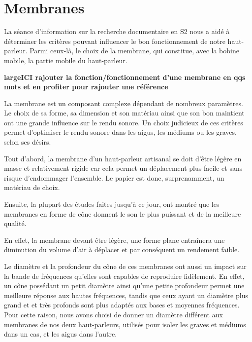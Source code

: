 \section{Membranes}

La séance d’information sur la recherche documentaire en S2
nous a aidé à déterminer les critères pouvant influencer
le bon fonctionnement de notre haut-parleur.
Parmi ceux-là, le choix de la membrane, qui constitue, avec la bobine mobile, la partie mobile
du haut-parleur.


\textbf{large{ICI rajouter la fonction/fonctionnement d'une membrane en qqs mots} et en profiter pour rajouter une référence}


La membrane est un composant complexe dépendant de nombreux paramètres. Le choix de sa forme, sa dimension et son matériau ainsi que son bon maintient ont une grande influence sur le rendu sonore. Un choix judicieux de ces critères permet d'optimiser le rendu sonore dans les aigus, les médiums ou les graves, selon ses désirs.

Tout d’abord, la membrane d’un haut-parleur artisanal
se doit d’être légère en masse et relativement rigide
car cela permet un déplacement plus facile et
sans risque d’endommager l’ensemble.
Le papier est donc, surprenamment, un matériau de choix.

Ensuite, la plupart des études faites jusqu’à ce jour,
ont montré que les membranes en forme de cône
donnent le son le plus puissant et de la meilleure qualité.

En effet, la membrane devant être légère, une forme plane entraînera une diminution du volume d’air à déplacer et par conséquent un rendement faible.\cite{f1964compound}

Le diamètre et la profondeur du cône de ces membranes
ont aussi un impact sur la bande de fréquences
qu’elles sont capables de reproduire fidèlement.
En effet, un cône possédant un petit diamètre ainsi qu'une petite profondeur
permet une meilleure réponse aux hautes fréquences,
tandis que ceux ayant un diamètre plus grand et et très profonds sont plus adaptés aux bases et moyennes fréquences.\cite[~p.2]{Miller}
Pour cette raison, nous avons choisi de donner un diamètre
différent aux membranes de nos deux haut-parleurs,
utilisés pour isoler les graves et médiums dans un cas,
et les aigus dans l'autre.

